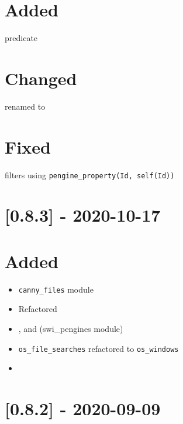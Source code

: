 \section{Added}

\begin{shortlist}
    \item {} predicate
\end{shortlist}

\section{Changed}

\begin{shortlist}
    \item {} renamed to 
\end{shortlist}

\section{Fixed}

\begin{shortlist}
    \item {} filters using \verb$pengine_property(Id, self(Id))$
\end{shortlist}

\section{[0.8.3] - 2020-10-17}

\section{Added}

\begin{itemize}
    \item \verb$canny_files$ module
    \item Refactored 
    \item {},  and  (swi_pengines module)
    \item \verb$os_file_searches$ refactored to \verb$os_windows$
    \item {}
\end{itemize}

\section{[0.8.2] - 2020-09-09}

